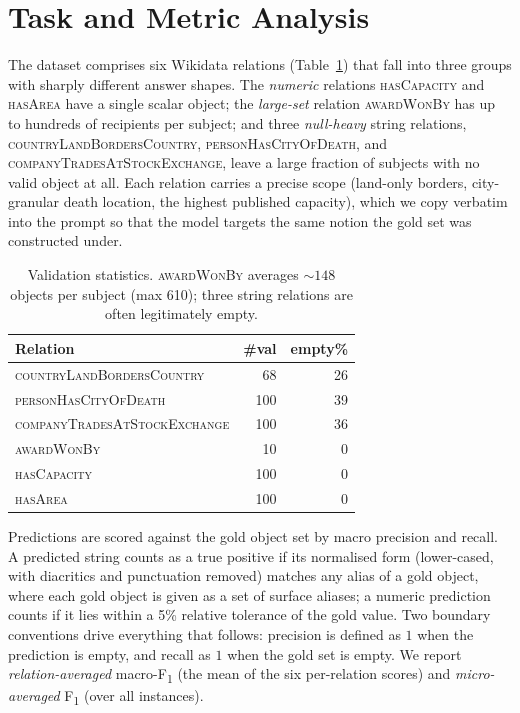 \section{Task and Metric Analysis}
\label{sec:task}
The dataset \citep{kalo2026akbc} comprises six Wikidata relations (Table~\ref{tab:data}) that fall
into three groups with sharply different answer shapes. The \emph{numeric}
relations \textsc{hasCapacity} and \textsc{hasArea} have a single scalar object;
the \emph{large-set} relation \textsc{awardWonBy} has up to hundreds of
recipients per subject; and three \emph{null-heavy} string relations,
\textsc{countryLandBordersCountry}, \textsc{personHasCityOfDeath}, and
\textsc{companyTradesAtStockExchange}, leave a large fraction of subjects with no
valid object at all. Each relation carries a precise scope (land-only borders,
city-granular death location, the highest published capacity), which we copy
verbatim into the prompt so that the model targets the same notion the gold set
was constructed under.

\begin{table}[t]
\centering\footnotesize
\setlength{\tabcolsep}{4pt}
\begin{tabular}{@{}lrr@{}}
\toprule
Relation & \#val & empty\% \\
\midrule
\textsc{countryLandBordersCountry} & 68 & 26 \\
\textsc{personHasCityOfDeath} & 100 & 39 \\
\textsc{companyTradesAtStockExchange} & 100 & 36 \\
\textsc{awardWonBy} & 10 & 0 \\
\textsc{hasCapacity} & 100 & 0 \\
\textsc{hasArea} & 100 & 0 \\
\bottomrule
\end{tabular}
\caption{Validation statistics. \textsc{awardWonBy} averages ${\sim}148$ objects
per subject (max 610); three string relations are often legitimately empty.}
\label{tab:data}
\end{table}

Predictions are scored against the gold object set by macro precision and recall.
A predicted string counts as a true positive if its normalised form (lower-cased,
with diacritics and punctuation removed) matches any alias of a gold object, where
each gold object is given as a set of surface aliases; a numeric prediction counts
if it lies within a 5\% relative tolerance of the gold value. Two boundary
conventions drive everything that follows: precision is defined as $1$ when the
prediction is empty, and recall as $1$ when the gold set is empty. We report
\emph{relation-averaged} macro-F\textsubscript{1} (the mean of the six per-relation
scores) and \emph{micro-averaged} F\textsubscript{1} (over all instances).

